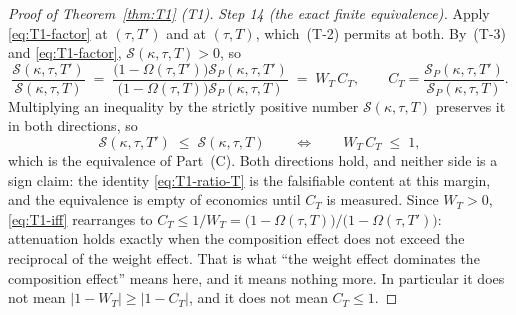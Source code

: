 \begin{proof}[Proof of Theorem~\ref{thm:T1} (T1)]
\emph{Step 14 (the exact finite equivalence).} Apply \eqref{eq:T1-factor} at $(\tau,T')$ and at
$(\tau,T)$, which~(T-2) permits at both. By~(T-3) and \eqref{eq:T1-factor},
$\mathcal S(\kappa,\tau,T) > 0$, so
\begin{equation}
\label{eq:T1-ratio-T}
\frac{\mathcal S(\kappa,\tau,T')}{\mathcal S(\kappa,\tau,T)}
\;=\; \frac{\bigl(1-\Omega(\tau,T')\bigr)\mathcal S_P(\kappa,\tau,T')}
            {\bigl(1-\Omega(\tau,T)\bigr)\mathcal S_P(\kappa,\tau,T)}
\;=\; W_T\,C_T,
\qquad
C_T = \frac{\mathcal S_P(\kappa,\tau,T')}{\mathcal S_P(\kappa,\tau,T)} .
\end{equation}
Multiplying an inequality by the strictly positive number $\mathcal S(\kappa,\tau,T)$ preserves it
in both directions, so
\begin{equation}
\label{eq:T1-iff}
\mathcal S(\kappa,\tau,T') \;\le\; \mathcal S(\kappa,\tau,T)
\qquad\Longleftrightarrow\qquad
W_T\,C_T \;\le\; 1 ,
\end{equation}
which is the equivalence of Part~(C). Both directions hold, and neither side is a sign claim: the
identity \eqref{eq:T1-ratio-T} is the falsifiable content at this margin, and the equivalence is
empty of economics until $C_T$ is measured. Since $W_T > 0$, \eqref{eq:T1-iff} rearranges to
$C_T \le 1/W_T = \bigl(1-\Omega(\tau,T)\bigr)/\bigl(1-\Omega(\tau,T')\bigr)$: attenuation holds
exactly when the composition effect does not exceed the reciprocal of the weight effect. That is
what ``the weight effect dominates the composition effect'' means here, and it means nothing more.
In particular it does not mean $\lvert 1-W_T\rvert \ge \lvert 1-C_T\rvert$, and it does not mean
$C_T \le 1$.


\end{proof}
